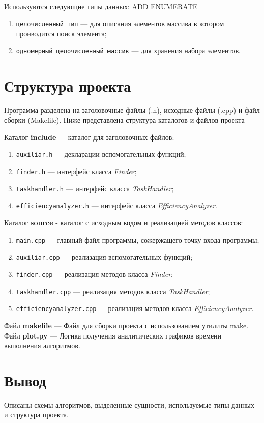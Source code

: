 Используются следующие типы данных: ADD ENUMERATE
\begin{enumerate}[label=\arabic*)]
	\item \texttt{целочисленный тип} --- для описания элементов массива в котором проиводится поиск элемента;
	\item \texttt{одномерный целочисленный массив} --- для хранения набора элементов.
\end{enumerate}

\section{Структура проекта}

Программа разделена на заголовочные файлы (.h), исходные файлы (.cpp) и файл сборки (Makefile). Ниже представлена структура каталогов и файлов проекта


Каталог \textbf{include} --- каталог для заголовочных файлов:
\begin{enumerate}[label=\arabic*)]
	\item \texttt{auxiliar.h} --- декларации вспомогательных функций;
	\item \texttt{finder.h} --- интерфейс класса \textit{Finder};
	\item \texttt{taskhandler.h} --- интерфейс класса \textit{TaskHandler};
	\item \texttt{efficiencyanalyzer.h} --- интерфейс класса \textit{EfficiencyAnalyzer}.
\end{enumerate}
Каталог \textbf{source} - каталог с исходным кодом и реализацией методов классов:
\begin{enumerate}[label=\arabic*)]
	\item \texttt{main.cpp} --- главный файл программы, сожержащего точку входа программы;
	\item \texttt{auxiliar.cpp} --- реализация вспомогательных функций;
	\item \texttt{finder.cpp} --- реализация методов класса \textit{Finder};
	\item \texttt{taskhandler.cpp} --- реализация методов класса \textit{TaskHandler};
	\item \texttt{efficiencyanalyzer.cpp} --- реализация методов класса \textit{EfficiencyAnalyzer}.
\end{enumerate}
Файл \textbf{makefile} --- Файл для сборки проекта с использованием утилиты make.
Файл \textbf{plot.py} --- Логика получения аналитических графиков времени выполнения алгоритмов.


\section*{Вывод}
Описаны схемы алгоритмов, выделенные сущности, используемые типы данных и структура проекта.
